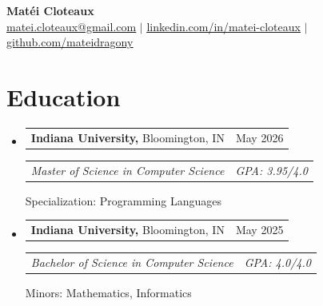 \documentclass[letterpaper,11pt]{article}
\makeatletter
\newcommand{\flexText}[2]{
  \begin{tabular*}{1.0\textwidth}[t]{l@{\extracolsep{\fill}}r}
    #1 & #2 \\
  \end{tabular*}
}
\newcommand{\resumeSubheading}[4]{
  \vspace{-2pt}\item
  \flexText{#1}{#2}
  \flexText{\textit{\small #3}}{\textit{\small #4}}
}
\newcommand{\resumeSubHeadingListStart}{\begin{itemize}[leftmargin=0in, label={}]}
\newcommand{\resumeSubHeadingListEnd}{\end{itemize}\vspace{-9pt}}
\makeatother
\begin{document}
\begin{center}
    \textbf{\Huge Matéi Cloteaux} \\ \vspace{5pt}
    \small \href{mailto:matei.cloteaux@gmail.com}{\underline{matei.cloteaux@gmail.com}} $|$ \href{https://www.linkedin.com/in/matei-cloteaux}{\underline{linkedin.com/in/matei-cloteaux}} $|$ \href{https://www.github.com/mateidragony}{\underline{github.com/mateidragony}}
    \vspace{-7pt}
  \end{center}


\section{Education}
\resumeSubHeadingListStart
\resumeSubheading
{\textbf{Indiana University,} Bloomington, IN}{May 2026}
{Master of Science in Computer Science}{GPA: 3.95/4.0}
\vspace{-19pt}

{\footnotesize Specialization: Programming Languages}
\vspace{-4pt}
\resumeSubheading
{\textbf{Indiana University,} Bloomington, IN}{May 2025}
{Bachelor of Science in Computer Science}{GPA: 4.0/4.0}
\vspace{-19pt}

{\footnotesize Minors: Mathematics, Informatics}
\vspace{-4pt}
\vspace{-4pt}
\resumeSubHeadingListEnd
\end{document}
